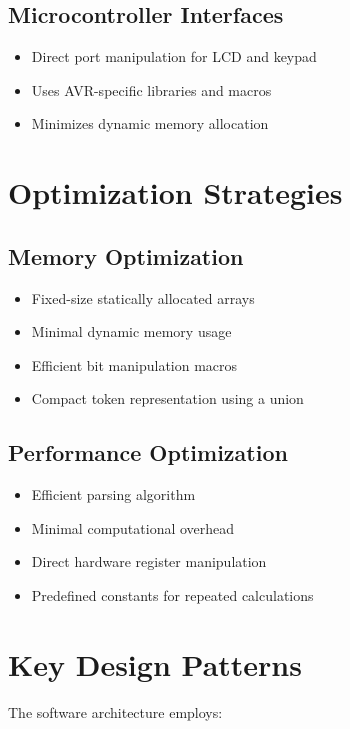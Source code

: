 \documentclass[journal]{IEEEtran}
\numberwithin{equation}{enumi}
\numberwithin{figure}{enumi}
\begin{document}
\subsection{Microcontroller Interfaces}

\begin{itemize}
    \item Direct port manipulation for LCD and keypad
    \item Uses AVR-specific libraries and macros
    \item Minimizes dynamic memory allocation
\end{itemize}

\section{Optimization Strategies}

\subsection{Memory Optimization}

\begin{itemize}
    \item Fixed-size statically allocated arrays
    \item Minimal dynamic memory usage
    \item Efficient bit manipulation macros
    \item Compact token representation using a union
\end{itemize}

\subsection{Performance Optimization}

\begin{itemize}
    \item Efficient parsing algorithm
    \item Minimal computational overhead
    \item Direct hardware register manipulation
    \item Predefined constants for repeated calculations
\end{itemize}

\section{Key Design Patterns}

The software architecture employs:
\end{document}
